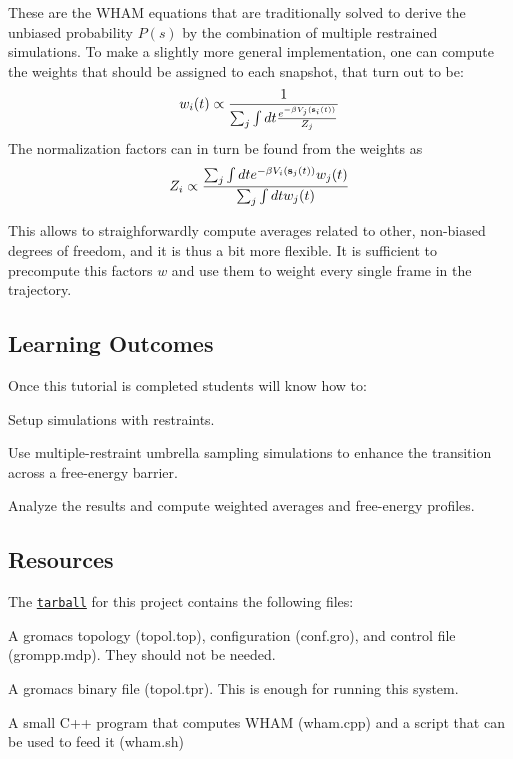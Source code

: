 These are the W\+H\+A\+M equations that are traditionally solved to derive the unbiased probability $P(s)$ by the combination of multiple restrained simulations. To make a slightly more general implementation, one can compute the weights that should be assigned to each snapshot, that turn out to be\+: \[ w_i(t)\propto \frac{1}{\sum_j\int dt\frac{e^{-\beta V_{j}({\bf s}_i(t))}}{Z_{j}} } \] The normalization factors can in turn be found from the weights as \[ Z_i\propto\frac{\sum_j \int dt e^{-\beta V_i({\bf s}_j(t))} w_j(t)}{ \sum_j \int dt w_j(t)} \]

This allows to straighforwardly compute averages related to other, non-\/biased degrees of freedom, and it is thus a bit more flexible. It is sufficient to precompute this factors $w$ and use them to weight every single frame in the trajectory.\hypertarget{belfast-4_belfast-4-learning-outcomes}{}\subsection{Learning Outcomes}\label{belfast-4_belfast-4-learning-outcomes}
Once this tutorial is completed students will know how to\+:


\begin{DoxyItemize}
\item Setup simulations with restraints.
\item Use multiple-\/restraint umbrella sampling simulations to enhance the transition across a free-\/energy barrier.
\item Analyze the results and compute weighted averages and free-\/energy profiles.
\end{DoxyItemize}\hypertarget{belfast-4_belfast-4-resources}{}\subsection{Resources}\label{belfast-4_belfast-4-resources}
The \href{tutorial-resources/belfast-4.tar.gz}{\tt tarball} for this project contains the following files\+:
\begin{DoxyItemize}
\item A gromacs topology (topol.\+top), configuration (conf.\+gro), and control file (grompp.\+mdp). They should not be needed.
\item A gromacs binary file (topol.\+tpr). This is enough for running this system.
\item A small C++ program that computes W\+H\+A\+M (wham.\+cpp) and a script that can be used to feed it (wham.\+sh)
\end{DoxyItemize}

